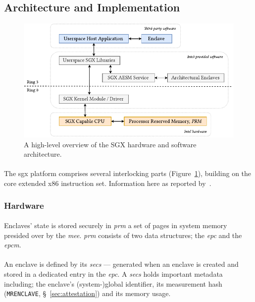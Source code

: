 \subsection{Architecture and Implementation}

\begin{figure}[]
    \centering
    \includegraphics[width=0.9\linewidth]{figures/SGX-AdvArchitecture.pdf}
    \caption{A high-level overview of the SGX hardware and software architecture.}
    \label{fig:sgx-advarch}
\end{figure}

\paragraph{} The \acrshort{sgx} platform comprises several interlocking parts (Figure~\ref{fig:sgx-advarch}), building on the core extended x86 instruction set. Information here as reported by~\cite{sgx-sgx-reference,Costan2016IntelSE}.

\subsubsection{Hardware}
\paragraph{} Enclaves' state is stored securely in \textit{\acrfull{prm}} a set of pages in system memory presided over by the \textit{\acrshort{mee}}. \textit{\acrshort{prm}} consists of two data structures; the \textit{\acrfull{epc}} and the \textit{\acrfull{epcm}}.

\paragraph{} An enclave is defined by its \textit{\acrshort{secs}} --- generated when an enclave is created and stored in a dedicated entry in the \textit{\acrshort{epc}}. A \textit{\acrshort{secs}} holds important metadata including; the enclave's (system-)global identifier, its measurement hash (\texttt{MRENCLAVE}, §~\ref{sec:attestation}) and its memory usage.


